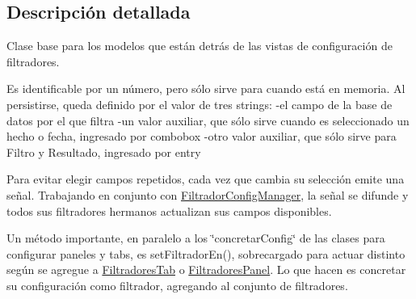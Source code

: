 \subsection{\-Descripción detallada}
\-Clase base para los modelos que están detrás de las vistas de configuración de filtradores.

\-Es identificable por un número, pero sólo sirve para cuando está en memoria. \-Al persistirse, queda definido por el valor de tres strings\-: -\/el campo de la base de datos por el que filtra -\/un valor auxiliar, que sólo sirve cuando es seleccionado un hecho o fecha, ingresado por combobox -\/otro valor auxiliar, que sólo sirve para \-Filtro y \-Resultado, ingresado por entry

\-Para evitar elegir campos repetidos, cada vez que cambia su selección emite una señal. \-Trabajando en conjunto con \hyperlink{classFiltradorConfigManager}{\-Filtrador\-Config\-Manager}, la señal se difunde y todos sus filtradores hermanos actualizan sus campos disponibles.

\-Un método importante, en paralelo a los \char`\"{}concretar\-Config\char`\"{} de las clases para configurar paneles y tabs, es set\-Filtrador\-En(), sobrecargado para actuar distinto según se agregue a \hyperlink{classFiltradoresTab}{\-Filtradores\-Tab} o \hyperlink{classFiltradoresPanel}{\-Filtradores\-Panel}. \-Lo que hacen es concretar su configuración como filtrador, agregando al conjunto de filtradores. 

